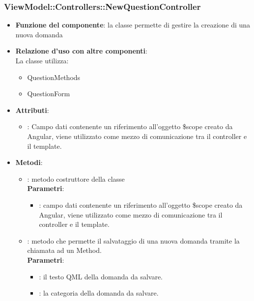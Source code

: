 \subsubsection{ViewModel::Controllers::NewQuestionController}
\begin{itemize}
\item\textbf{Funzione del componente}: la classe permette di gestire la creazione di una nuova domanda
	\item\textbf{Relazione d'uso con altre componenti}: \\
La classe utilizza:
	\begin{itemize}
		\item QuestionMethods
		\item QuestionForm
	\end{itemize}
\item\textbf{Attributi}:
	\begin{itemize}
		\item{}: Campo dati contenente un riferimento all’oggetto \$scope creato da Angular, viene utilizzato come mezzo di comunicazione tra il controller e il template.\\
	\end{itemize}
\item\textbf{Metodi}:
	\begin{itemize}
		\item{}: metodo costruttore della classe\\
		\textbf{Parametri}:
			\begin{itemize}
				\item{}: campo dati contenente un riferimento all’oggetto \$scope creato da Angular, viene utilizzato come mezzo di comunicazione tra il controller e il template.\\
			\end{itemize}
		\item{}: metodo che permette il salvataggio di una nuova domanda tramite la chiamata ad un Method.\\
		\textbf{Parametri}:
			\begin{itemize}
				\item{}: il testo QML della domanda da salvare.\\
				\item{}: la categoria della domanda da salvare.\\
			\end{itemize}
	\end{itemize}
\end{itemize}

